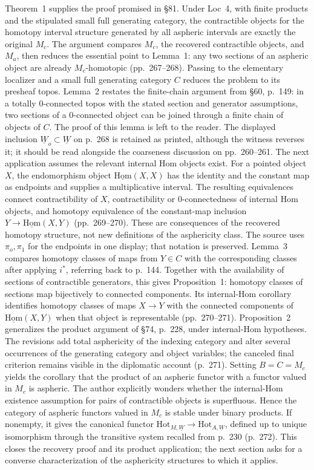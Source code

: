 \documentclass[10pt,oneside]{book}
\begin{document}
Theorem~1 supplies the proof promised in \S81. Under Loc~4, with finite products and the stipulated small full generating category, the contractible objects for the homotopy interval structure generated by all aspheric intervals are exactly the original $M_c$. The argument compares $M_c$, the recovered contractible objects, and $M_a$, then reduces the essential point to Lemma~1: any two sections of an aspheric object are already $M_c$-homotopic (pp.\ 267--268). Passing to the elementary localizer and a small full generating category $C$ reduces the problem to its presheaf topos. Lemma~2 restates the finite-chain argument from \S60, p.\ 149: in a totally 0-connected topos with the stated section and generator assumptions, two sections of a 0-connected object can be joined through a finite chain of objects of $C$. The proof of this lemma is left to the reader. The displayed inclusion $\underline W_o\subset\underline W$ on p.\ 268 is retained as printed, although the witness reverses it; it should be read alongside the coarseness discussion on pp.\ 260--261. The next application assumes the relevant internal Hom objects exist. For a pointed object $X$, the endomorphism object $\underline{\mathrm{Hom}}(X,X)$ has the identity and the constant map as endpoints and supplies a multiplicative interval. The resulting equivalences connect contractibility of $X$, contractibility or 0-connectedness of internal Hom objects, and homotopy equivalence of the constant-map inclusion $Y\to\underline{\mathrm{Hom}}(X,Y)$ (pp.\ 269--270). These are consequences of the recovered homotopy structure, not new definitions of the asphericity class. The source uses $\pi_o,\pi_1$ for the endpoints in one display; that notation is preserved. Lemma~3 compares homotopy classes of maps from $Y\in C$ with the corresponding classes after applying $i^*$, referring back to p.\ 144. Together with the availability of sections of contractible generators, this gives Proposition~1: homotopy classes of sections map bijectively to connected components. Its internal-Hom corollary identifies homotopy classes of maps $X\to Y$ with the connected components of $\underline{\mathrm{Hom}}(X,Y)$ when that object is representable (pp.\ 270--271). Proposition~2 generalizes the product argument of \S74, p.\ 228, under internal-Hom hypotheses. The revisions add total asphericity of the indexing category and alter several occurrences of the generating category and object variables; the canceled final criterion remains visible in the diplomatic account (p.\ 271). Setting $B=C=M_c$ yields the corollary that the product of an aspheric functor with a functor valued in $M_c$ is aspheric. The author explicitly wonders whether the internal-Hom existence assumption for pairs of contractible objects is superfluous. Hence the category of aspheric functors valued in $M_c$ is stable under binary products. If nonempty, it gives the canonical functor $\mathrm{Hot}_{M,\underline W}\to\mathrm{Hot}_{A,\underline W}$, defined up to unique isomorphism through the transitive system recalled from p.\ 230 (p.\ 272). This closes the recovery proof and its product application; the next section asks for a converse characterization of the asphericity structures to which it applies.
\end{document}

